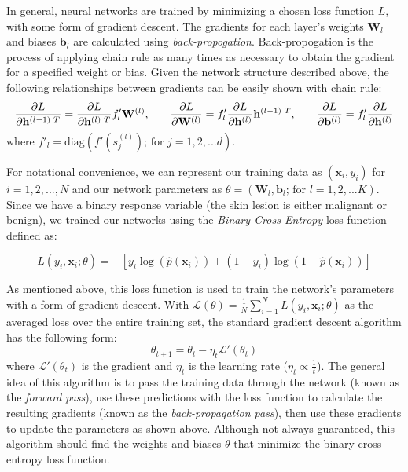 \documentclass [MAS] {uclathes}
\begin{document}
In general, neural networks are trained by minimizing a chosen loss function $L$, with some form of gradient descent. The gradients for each layer's weights $\mathbf{W}_l$ and biases $\mathbf{b}_l$ are calculated using \textit{back-propogation}. Back-propogation is the process of applying chain rule as many times as necessary to obtain the gradient for a specified weight or bias. Given the network structure described above, the following relationships between gradients can be easily shown with chain rule:
$$\frac{\partial L}{\partial \mathbf{h}^{(l-1) \text{ }T}} = \frac{\partial L}{\partial \mathbf{h}^{(l) \text{ }T}} f'_{l} \mathbf{W}^{(l)} \text{,\quad \quad} \frac{\partial L}{\partial \mathbf{W}^{(l)}} = f'_{l} \frac{\partial L}{\partial \mathbf{h}^{(l)}}\mathbf{h}^{(l-1) \text{ }T} \text{,\quad \quad} \frac{\partial L}{\partial \mathbf{b}^{(l)}} = f'_{l} \frac{\partial L}{\partial \mathbf{h}^{(l)}}$$ where $f'_{l} = \text{diag}(f'(s^{(l)}_{j})  \text{; for } j = 1, 2, ... d)$.


For notational convenience, we can represent our training data as $(\mathbf{x}_i, y_i)$ for $i = 1, 2, ..., N$ and our network parameters as $\theta = (\mathbf{W}_l, \mathbf{b}_l  \text{; for } l = 1, 2, ... K)$. Since we have a binary response variable (the skin lesion is either malignant or benign), we trained our networks using the \textit{Binary Cross-Entropy} loss function defined as: 

$$L(y_i, \mathbf{x}_i; \theta) = - \left[ y_i\log(\hat{p}(\mathbf{x}_i)) + (1 - y_i)\log(1 - \hat{p}(\mathbf{x}_i)) \right]$$ 

As mentioned above, this loss function is used to train the network's parameters with a form of gradient descent. With $\mathcal{L}(\theta) = \frac{1}{N} \sum_{i=1}^{N} L(y_i, \mathbf{x}_i; \theta)$ as the averaged loss over the entire training set, the standard gradient descent algorithm has the following form: $$\theta_{t+1} = \theta_{t} - \eta_t \mathcal{L}'(\theta_t)$$ where $\mathcal{L}'(\theta_t)$ is the gradient and $\eta_t$ is the learning rate ($\eta_t \propto \frac{1}{t}$). The general idea of this algorithm is to pass the training data through the network (known as the \textit{forward pass}), use these predictions with the loss function to calculate the resulting gradients (known as the \textit{back-propagation pass}), then use these gradients to update the parameters as shown above. Although not always guaranteed, this algorithm should find the weights and biases $\theta$ that minimize the binary cross-entropy loss function. 
\end{document}
